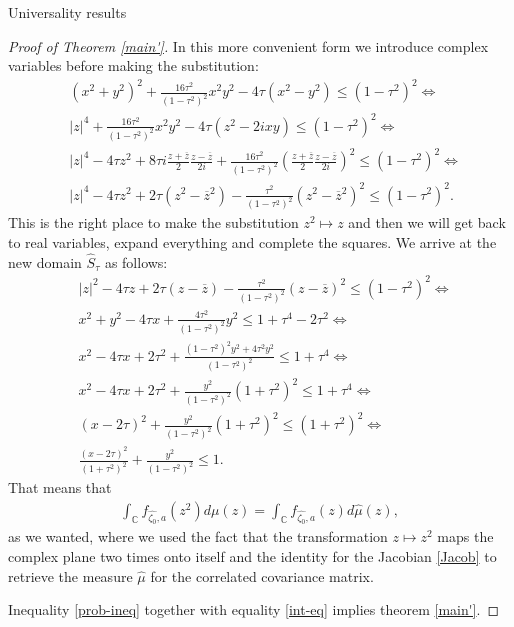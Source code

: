 \documentclass[11pt, a4paper, oneside]{book}
\numberwithin{equation}{chapter}
\begin{document}
\begin{section}{Universality results}
\begin{proof}[Proof of Theorem \ref{main'}]
In this more convenient form we introduce complex variables before making the substitution:
\begin{align*}
    &(x^2+y^2)^2 + \frac{16\tau^2}{(1-\tau^2)^2}x^2y^2 - 4\tau (x^2-y^2) \leq (1-\tau^2)^2 \Leftrightarrow \\
    &|z|^4 + \frac{16\tau^2}{(1-\tau^2)^2}x^2y^2 - 4\tau (z^2 - 2ixy) \leq (1-\tau^2)^2 \Leftrightarrow \\
    &|z|^4 - 4\tau z^2 + 8\tau i \frac{z+\overline{z}}{2}\frac{z-\overline{z}}{2i} + \frac{16\tau^2}{(1-\tau^2)^2} \left ( \frac{z+\overline{z}}{2}\frac{z-\overline{z}}{2i} \right )^2 \leq (1-\tau^2)^2 \Leftrightarrow \\
    &|z|^4 -4\tau z^2 + 2\tau (z^2 - \overline{z}^2) - \frac{\tau^2}{(1-\tau^2)^2} (z^2 - \overline{z}^2)^2 \leq (1-\tau^2)^2 .
\end{align*}
This is the right place to make the substitution $z^2 \mapsto z$ and then we will get back to real variables, expand everything and complete the squares. We arrive at the new domain $\widehat{S}_{\tau}$ as follows:
%
\begin{align*}
    &|z|^2 - 4\tau z + 2\tau (z-\overline{z}) - \frac{\tau^2}{(1-\tau^2)^2} (z - \overline{z})^2 \leq (1-\tau^2)^2 \Leftrightarrow \\
    &x^2+y^2 - 4\tau x + \frac{4\tau^2}{(1-\tau^2)^2} y^2 \leq 1 + \tau^4 - 2\tau^2 \Leftrightarrow \\
    &x^2 - 4\tau x + 2\tau^2 + \frac{(1-\tau^2)^2y^2 + 4\tau^2y^2}{(1-\tau^2)^2} \leq 1 + \tau^4 \Leftrightarrow \\
    &x^2 - 4\tau x + 2\tau^2 + \frac{y^2}{(1-\tau^2)^2}(1+\tau^2)^2 \leq 1 + \tau^4 \Leftrightarrow \\
    &(x- 2\tau)^2 + \frac{y^2}{(1-\tau^2)^2}(1+\tau^2)^2 \leq (1+\tau^2)^2 \Leftrightarrow \\
    &\frac{(x-2\tau)^2}{(1+\tau^2)^2} + \frac{y^2}{(1-\tau^2)^2} \leq 1 .
\end{align*}
%
That means that
\begin{align} \label{int-eq}
\int_{\mathbb{C}} f_{\widehat{\zeta_0},a}(z^2) d \mu (z) = \int_{{\mathbb{C}}} f_{\widehat{\zeta_0},a}(z) d \widehat{\mu} (z),
\end{align}
as we wanted, where we used the fact that the transformation $z \mapsto z^2$ maps the complex plane two times onto itself and the identity for the Jacobian \eqref{Jacob} to retrieve the measure $\widehat{\mu}$ for the correlated covariance matrix.

Inequality \ref{prob-ineq} together with equality \ref{int-eq} implies theorem \ref{main'}.
%
\end{proof}
\end{section}
\end{document}
